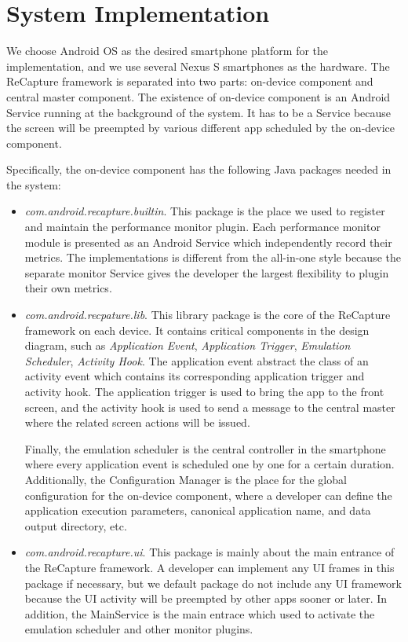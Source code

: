 \section{System Implementation} \label{sec:implementation}
We choose Android OS as the desired smartphone platform for the implementation, and we use several Nexus S smartphones as the hardware. The ReCapture framework is separated into two parts: on-device component and central master component. The existence of on-device component is an Android Service running at the background of the system. It has to be a Service because the screen will be preempted by various different app scheduled by the on-device component.

Specifically, the on-device component has the following Java packages needed in the system:
\begin{itemize}
\item \emph{com.android.recapture.builtin}. This package is the place we used to register and maintain the performance monitor plugin. Each performance monitor module is presented as an Android Service which independently record their metrics. The implementations is different from the all-in-one style because the separate monitor Service gives the developer the largest flexibility to plugin their own metrics.

\item \emph{com.android.recpature.lib}. This library package is the core of the ReCapture framework on each device. It contains critical components in the design diagram, such as \emph{Application Event}, \emph{Application Trigger}, \emph{Emulation Scheduler}, \emph{Activity Hook}. The application event abstract the class of an activity event which contains its corresponding application trigger and activity hook. The application trigger is used to bring the app to the front screen, and the activity hook is used to send a message to the central master where the related screen actions will be issued.

Finally, the emulation scheduler is the central controller in the smartphone where every application event is scheduled one by one for a certain duration. Additionally, the Configuration Manager is the place for the global configuration for the on-device component, where a developer can define the application execution parameters, canonical application name, and data output directory, etc.

\item\emph{com.android.recapture.ui}. This package is mainly about the main entrance of the ReCapture framework. A developer can implement any UI frames in this package if necessary, but we default package do not include any UI framework because the UI activity will be preempted by other apps sooner or later. In addition, the MainService is the main entrace which used to activate the emulation scheduler and other monitor plugins.
\end{itemize}

